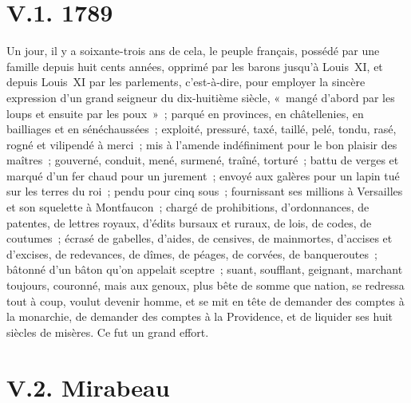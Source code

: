 \documentclass[french,twoside]{book} %
\newcommand\chaptercont{} %
\begin{document}
\chaptercont

\section[{V.1. 1789}]{V.1. 1789}

\noindent Un jour, il y a soixante-trois ans de cela, le peuple français, possédé par une famille depuis huit cents années, opprimé par les barons jusqu’à Louis XI, et depuis Louis XI par les parlements, c’est-à-dire, pour employer la sincère expression d’un grand seigneur du dix-huitième siècle, « mangé d’abord par les loups et ensuite par les poux » ; parqué en provinces, en châtellenies, en bailliages et en sénéchaussées ; exploité, pressuré, taxé, taillé, pelé, tondu, rasé, rogné et vilipendé à merci ; mis à l’amende indéfiniment pour le bon plaisir des maîtres ; gouverné, conduit, mené, surmené, traîné, torturé ; battu de verges et marqué d’un fer chaud pour un jurement ; envoyé aux galères pour un lapin tué sur les terres du roi ; pendu pour cinq sous ; fournissant ses millions à Versailles et son squelette à Montfaucon ; chargé de prohibitions, d’ordonnances, de patentes, de lettres royaux, d’édits bursaux et ruraux, de lois, de codes, de coutumes ; écrasé de gabelles, d’aides, de censives, de mainmortes, d’accises et d’excises, de redevances, de dîmes, de péages, de corvées, de banqueroutes ; bâtonné d’un bâton qu’on appelait sceptre ; suant, soufflant, geignant, marchant toujours, couronné, mais aux genoux, plus bête de somme que nation, se redressa tout à coup, voulut devenir homme, et se mit en tête de demander des comptes à la monarchie, de demander des comptes à la Providence, et de liquider ses huit siècles de misères. Ce fut un grand effort.

\section[{V.2. Mirabeau}]{V.2. Mirabeau}
\end{document}
